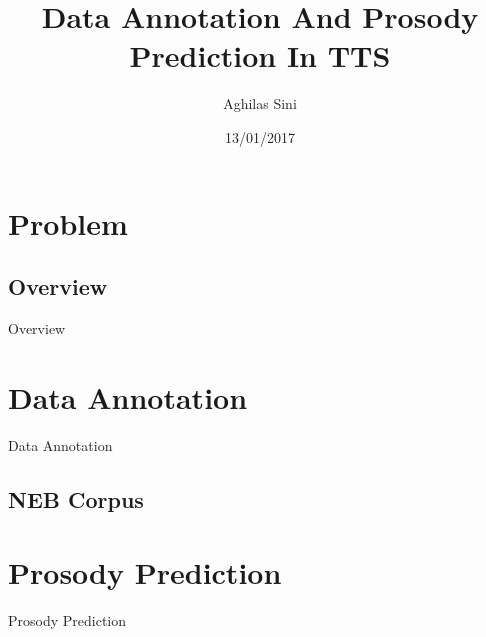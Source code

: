 \documentclass{beamer}
\title[Background and Literature]{Data Annotation And Prosody Prediction In TTS}
\author{Aghilas Sini}
\institute{Université de Rennes 1}
\date{13/01/2017}
\begin{document}
\begin{frame}
  \titlepage
\end{frame}



\section{Problem}
%
\subsection{Overview}
\begin{frame}{Overview}

\end{frame}

%
\section{Data Annotation}
\begin{frame}{Data Annotation}


\end{frame}
%
\subsection{NEB Corpus}
\begin{frame}

\end{frame}
%
\section{Prosody Prediction}
\begin{frame}{Prosody Prediction}
	
\end{frame}
%
\begin{frame}

\end{frame}
\end{document}
